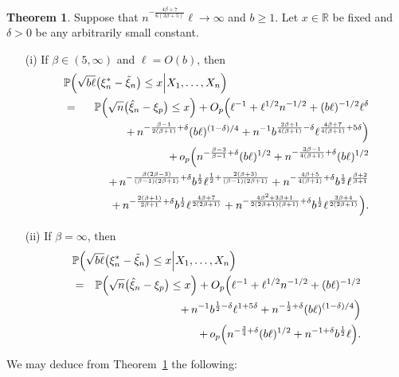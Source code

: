 \documentclass[a4paper, 12pt]{article}
\theoremstyle{plain}
\theoremstyle{definition}
\newcommand{\prob}{{\Bbb P}}
\newtheorem{thm}{Theorem}
\begin{document}
\begin{thm}
\label{thm:main}
Suppose that $n^{-\frac{4\beta+7}{6(3\beta+5)}}\ell\rightarrow\infty$ and
$b\ge 1$.
Let $x\in\mathbb{R}$ be fixed and $\delta>0$ be any arbitrarily small constant.
\begin{itemize}
\item[(i)] If $\beta\in(5,\infty)$ and $\ell=O(b)$, then
\begin{eqnarray*}
\lefteqn{
\prob\Big(\sqrt{b\ell}\big(\xi^*_n-\tilde\xi_n\big)\le x
\Big|X_1,\ldots,X_n\Big)}\nonumber\\
&=&\prob\Big(\sqrt{n}\big(\hat\xi_n-\xi_p\big)\le x\Big)
+
O_p\Big(\ell^{-1}+\ell^{1/2}n^{-1/2}+(b\ell)^{-1/2}\ell^\delta\nonumber\\
&&\qquad +\,n^{-\frac{\beta-1}{2(\beta+1)}+\delta}(b\ell)^{(1-\delta)/4}
+n^{-1}b^{\frac{2\beta+1}{4(\beta+1)}-\delta}
\ell^{\frac{4\beta+7}{4(\beta+1)}+5\delta}
\Big)\nonumber\\
&&+\,
o_p\Big(
n^{-\frac{\beta-3}{\beta-1}+\delta}(b\ell)^{1/2}
+n^{-\frac{3\beta-1}{4(\beta+1)}+\delta}(b\ell)^{1/2} \nonumber\\
&&\qquad+\,
n^{-\frac{\beta(2\beta-3)}{(\beta-1)(2\beta+1)}+\delta}b^{\frac{1}{2}}
\ell^{\frac{1}{2}+\frac{2(\beta+3)}{(\beta-1)(2\beta+1)}}
+
n^{-\frac{4\beta+5}{4(\beta+1)}+\delta}b^{\frac{1}{2}}
\ell^{\frac{\beta+2}{\beta+1}}\nonumber\\
&&\qquad+\,
n^{-\frac{2(\beta+1)}{2\beta+1}+\delta}b^{\frac{1}{2}}
\ell^{\frac{4\beta+7}{2(2\beta+1)}}
+n^{-\frac{4\beta^2+3\beta+1}{2(2\beta+1)(\beta+1)}+\delta}
b^{\frac{1}{2}}\ell^{\frac{3\beta+4}{2(2\beta+1)}}\Big).
\end{eqnarray*}
\item[(ii)]
If $\beta=\infty$, then
\begin{eqnarray*}
\lefteqn{
\prob\Big(\sqrt{b\ell}\big(\xi^*_n-\tilde\xi_n\big)\le x
\Big|X_1,\ldots,X_n\Big)}\nonumber\\
&=&\prob\Big(\sqrt{n}\big(\hat\xi_n-\xi_p\big)\le x\Big)
+
O_p\Big(\ell^{-1}+\ell^{1/2}n^{-1/2}+(b\ell)^{-1/2}\nonumber\\
&&\qquad+\,
n^{-1}b^{\frac{1}{2}-\delta}
\ell^{1+5\delta}
+n^{-\frac{1}{2}+\delta}(b\ell)^{(1-\delta)/4}\Big)\nonumber\\
&&\qquad+\,
o_p\Big(
n^{-\frac{3}{4}+\delta}(b\ell)^{1/2}+n^{-1+\delta}b^{\frac{1}{2}}\ell\Big).
\end{eqnarray*}
\end{itemize}
\end{thm}
We may deduce from Theorem~\ref{thm:main} the following:
\end{document}
